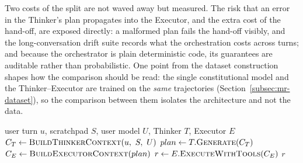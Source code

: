 Two costs of the split are not waved away but measured. The risk that an error in the Thinker's plan propagates into the Executor, and the extra cost of the hand-off, are exposed directly: a malformed plan fails the hand-off visibly, and the long-conversation drift suite records what the orchestration costs across turns; and because the orchestrator is plain deterministic code, its guarantees are auditable rather than probabilistic. One point from the dataset construction shapes how the comparison should be read: the single constitutional model and the Thinker--Executor are trained on the \emph{same} trajectories (Section~\ref{subsec:mr-dataset}), so the comparison between them isolates the architecture and not the data.

\begin{algorithm}[H]
\caption{Thinker--Executor orchestration (deterministic; the two models run sequentially).}
\label{alg:te-orchestration}
\begin{algorithmic}[1]
  \Require user turn $u$, scratchpad $S$, user model $U$, Thinker $T$, Executor $E$
  \State $C_T \gets \Call{BuildThinkerContext}{u,\ S,\ U}$
  \State $plan \gets T.\Call{Generate}{C_T}$ 
  \State {} 
  \State $C_E \gets \Call{BuildExecutorContext}{plan}$
  \State $r \gets E.\Call{ExecuteWithTools}{C_E}$ 
  \State \Return $r$ 
\end{algorithmic}
\end{algorithm}

